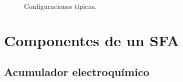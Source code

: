 \begin{figure}
{}\hfill{}\hfill{}

\caption{Configuraciones típicas.\label{fig:Configuraciones-tipicas_SFA}}



\end{figure}



\section{Componentes de un SFA}


\subsection{Acumulador electroquímico}


